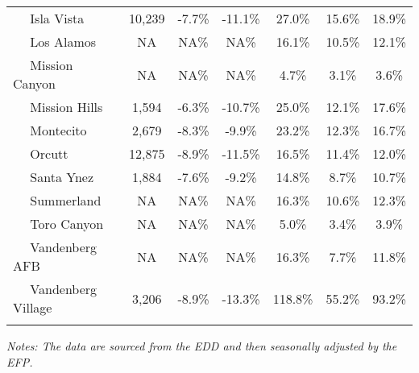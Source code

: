 \documentclass[12pt]{article}
\begin{document}
\begin{landscape}
\begin{table}
\begin{tabular}{|l|c|c|c||c|c|c|}
$\quad$ Isla Vista & 10,239 & -7.7\% & -11.1\% & 27.0\% & 15.6\% & 18.9\% \\
$\quad$ Los Alamos & NA & NA\% & NA\% & 16.1\% & 10.5\% & 12.1\% \\
$\quad$ Mission Canyon & NA & NA\% & NA\% & 4.7\% & 3.1\% & 3.6\% \\
$\quad$ Mission Hills & 1,594 & -6.3\% & -10.7\% & 25.0\% & 12.1\% & 17.6\% \\
$\quad$ Montecito & 2,679 & -8.3\% & -9.9\% & 23.2\% & 12.3\% & 16.7\% \\
$\quad$ Orcutt & 12,875 & -8.9\% & -11.5\% & 16.5\% & 11.4\% & 12.0\% \\
$\quad$ Santa Ynez & 1,884 & -7.6\% & -9.2\% & 14.8\% & 8.7\% & 10.7\% \\
$\quad$ Summerland & NA & NA\% & NA\% & 16.3\% & 10.6\% & 12.3\% \\
$\quad$ Toro Canyon & NA & NA\% & NA\% & 5.0\% & 3.4\% & 3.9\% \\
$\quad$ Vandenberg AFB & NA & NA\% & NA\% & 16.3\% & 7.7\% & 11.8\% \\
$\quad$ Vandenberg Village & 3,206 & -8.9\% & -13.3\% & 118.8\% & 55.2\% & 93.2\% \\
&&&&&& \\ \hline \hline
\end{tabular}
\par
\vspace{.5em}
\footnotesize
\textit{Notes: The data are sourced from the EDD and then seasonally adjusted by the EFP.}
\end{table}
\end{landscape}
\end{document}
